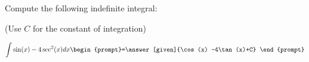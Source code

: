 \documentclass{ximera}
\author{Jim Talamo}
\begin{document}
\begin{exercise}
Compute the following indefinite integral:

\begin{prompt} (Use $C$ for the constant of integration) \end{prompt}

\[
\int \sin(x)-4\sec^2(x) dx 
\begin{prompt}=\answer[given]{\cos(x) -4\tan(x)+C} \end{prompt}
\]

\end{exercise}
\end{document}
